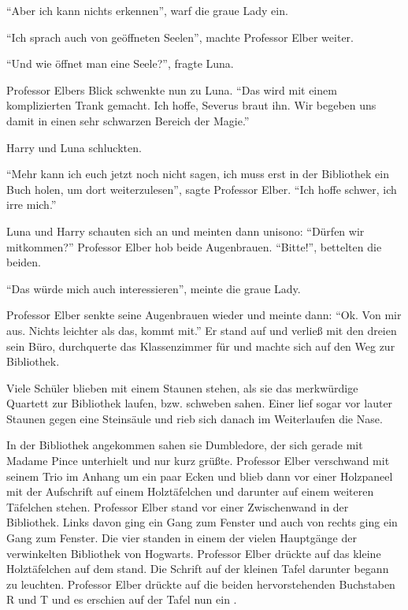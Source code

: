 \enquote{Aber ich kann nichts erkennen}, warf die graue Lady ein.

\enquote{Ich sprach auch von geöffneten Seelen}, machte Professor Elber weiter.

\enquote{Und wie öffnet man eine Seele?}, fragte Luna.

Professor Elbers Blick schwenkte nun zu Luna. \enquote{Das wird mit einem komplizierten Trank gemacht. Ich hoffe, Severus braut ihn. Wir begeben uns damit in einen sehr schwarzen Bereich der Magie.}

Harry und Luna schluckten.

\enquote{Mehr kann ich euch jetzt noch nicht sagen, ich muss erst in der Bibliothek ein Buch holen, um dort weiterzulesen}, sagte Professor Elber. \enquote{Ich hoffe schwer, ich irre mich.}

Luna und Harry schauten sich an und meinten dann unisono: \enquote{Dürfen wir mitkommen?} Professor Elber hob beide Augenbrauen. \enquote{Bitte!}, bettelten die beiden.

\enquote{Das würde mich auch interessieren}, meinte die graue Lady.

Professor Elber senkte seine Augenbrauen wieder und meinte dann: \enquote{Ok. Von mir aus. Nichts leichter als das, kommt mit.} Er stand auf und verließ mit den dreien sein Büro, durchquerte das Klassenzimmer für  und machte sich auf den Weg zur Bibliothek.

Viele Schüler blieben mit einem Staunen stehen, als sie das merkwürdige Quartett zur Bibliothek laufen, bzw. schweben sahen. Einer lief sogar vor lauter Staunen gegen eine Steinsäule und rieb sich danach im Weiterlaufen die Nase.

In der Bibliothek angekommen sahen sie Dumbledore, der sich gerade mit Madame Pince unterhielt und nur kurz grüßte. Professor Elber verschwand mit seinem Trio im Anhang um ein paar Ecken und blieb dann vor einer Holzpaneel mit der Aufschrift  auf einem Holztäfelchen und darunter auf einem weiteren Täfelchen  stehen. Professor Elber stand vor einer Zwischenwand in der Bibliothek. Links davon ging ein Gang zum Fenster und auch von rechts ging ein Gang zum Fenster. Die vier standen in einem der vielen Hauptgänge der verwinkelten Bibliothek von Hogwarts. Professor Elber drückte auf das kleine Holztäfelchen auf dem  stand. Die Schrift auf der kleinen Tafel darunter begann zu leuchten. Professor Elber drückte auf die beiden hervorstehenden Buchstaben R und T und es erschien auf der Tafel nun ein .

